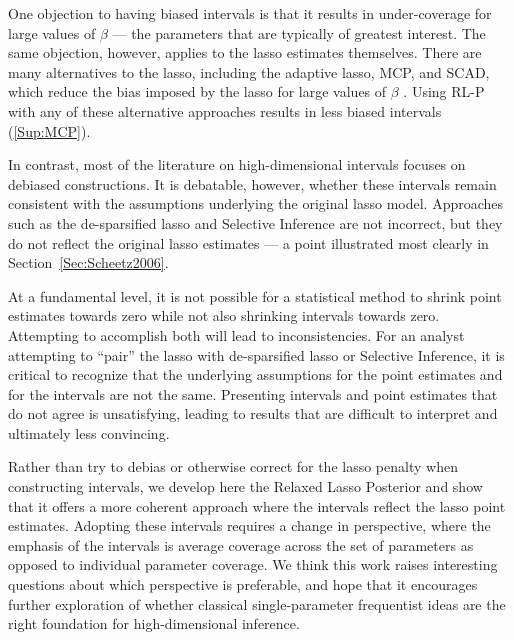 One objection to having biased intervals is that it results in under-coverage for large values of $\beta$ --- the parameters that are typically of greatest interest. The same objection, however, applies to the lasso estimates themselves. There are many alternatives to the lasso, including the adaptive lasso, MCP, and SCAD, which reduce the bias imposed by the lasso for large values of $\beta$ \citep{Zou2006, Zhang2010, Fan2001}. Using RL-P with any of these alternative approaches results in less biased intervals (\ref{Sup:MCP}).

In contrast, most of the literature on high-dimensional intervals focuses on debiased constructions. It is debatable, however, whether these intervals remain consistent with the assumptions underlying the original lasso model. Approaches such as the de-sparsified lasso and Selective Inference are not incorrect, but they do not reflect the original lasso estimates --- a point illustrated most clearly in Section~\ref{Sec:Scheetz2006}.

At a fundamental level, it is not possible for a statistical method to shrink point estimates towards zero while not also shrinking intervals towards zero. Attempting to accomplish both will lead to inconsistencies. For an analyst attempting to ``pair'' the lasso with de-sparsified lasso or Selective Inference, it is critical to recognize that the underlying assumptions for the point estimates and for the intervals are not the same. Presenting intervals and point estimates that do not agree is unsatisfying, leading to results that are difficult to interpret and ultimately less convincing.

Rather than try to debias or otherwise correct for the lasso penalty when constructing intervals, we develop here the Relaxed Lasso Posterior and show that it offers a more coherent approach where the intervals reflect the lasso point estimates. Adopting these intervals requires a change in perspective, where the emphasis of the intervals is average coverage across the set of parameters as opposed to individual parameter coverage. We think this work raises interesting questions about which perspective is preferable, and hope that it encourages further exploration of whether classical single-parameter frequentist ideas are the right foundation for high-dimensional inference.
